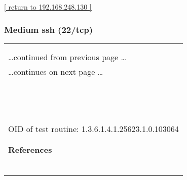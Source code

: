 \documentclass{article}
\begin{document}
\begin{footnotesize}\hyperref[host:192.168.248.130]{[ return to 192.168.248.130 ]}\end{footnotesize}
\subsubsection{Medium ssh (22/tcp)}
\label{port:192.168.248.130 ssh (22/tcp) Medium}

\begin{longtable}{|p{}|}
\hline
\rowcolor{openvas_warning}{\color{white}{Medium (CVSS: 5.0) }}\\
\rowcolor{openvas_warning}{\color{white}{NVT: OpenSSH Legacy Certificate Signing Information Disclosure Vulnerability}}\\
\hline
\endfirsthead
\hfill\ldots continued from previous page \ldots \\
\hline
\endhead
\hline
\ldots continues on next page \ldots \\
\endfoot
\hline
\endlastfoot
\\
\rowcolor{white}{\verb= Summary:=}\\
\rowcolor{white}{\verb= Checks whether OpenSSH is prone to an information-disclosure vulnerability.=}\\
\rowcolor{white}{\verb=Successful exploits will allow attackers to gain access to sensitive=}\\
\rowcolor{white}{\verb=information; this may lead to further attacks.=}\\
\rowcolor{white}{\verb=Versions 5.6 and 5.7 of OpenSSH are vulnerable.=}\\
\rowcolor{white}{\verb= Vulnerability Detection:=}\\
\rowcolor{white}{\verb= The SSH banner is analysed for presence of openssh and the version=}\\
\rowcolor{white}{\verb=information is then taken from that banner.=}\\
\rowcolor{white}{\verb= Solution:=}\\
\rowcolor{white}{\verb= Updates are available. Please see the references for more information.=}\\
\rowcolor{white}{\verb==}\\
\rowcolor{white}{\verb==}\\
\\
OID of test routine: 1.3.6.1.4.1.25623.1.0.103064\\
\\

      \hline
      \\
\textbf{References}\\
\rowcolor{white}{\verb=CVE: CVE-2011-0539=}\\
\rowcolor{white}{\verb=BID:46155=}\\
\rowcolor{white}{\verb=Other:=}\\
\rowcolor{white}{\verb=  URL:https://www.securityfocus.com/bid/46155=}\\
\rowcolor{white}{\verb=   URL:http://www.openssh.com/txt/release-5.8=}\\
\rowcolor{white}{\verb=   URL:http://www.openssh.com=}\\
\end{longtable}
\end{document}
